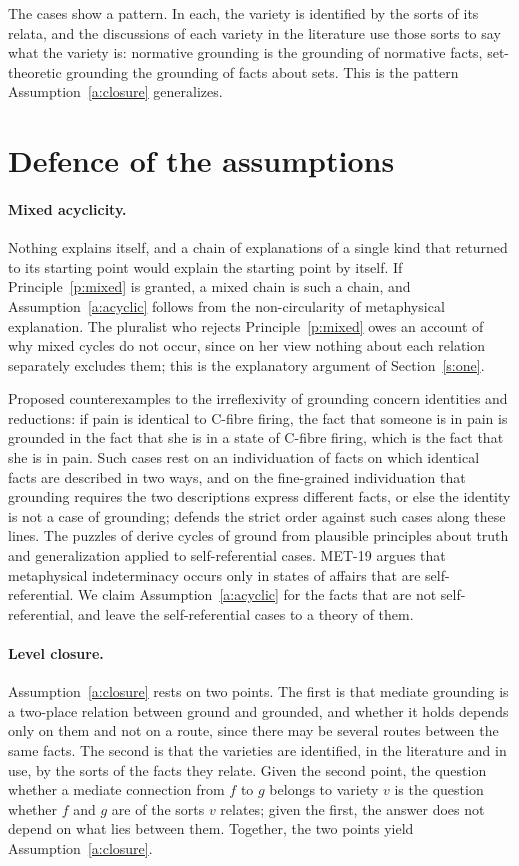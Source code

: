 \documentclass{situationist-preprint}
\begin{document}
The cases show a pattern. In each, the variety is identified by the sorts of its relata, and the discussions of each variety in the literature use those sorts to say what the variety is: normative grounding is the grounding of normative facts, set-theoretic grounding the grounding of facts about sets. This is the pattern Assumption~\ref{a:closure} generalizes.

\section{Defence of the assumptions}\label{s:defence}

\paragraph{Mixed acyclicity.} Nothing explains itself, and a chain of explanations of a single kind that returned to its starting point would explain the starting point by itself. If Principle~\ref{p:mixed} is granted, a mixed chain is such a chain, and Assumption~\ref{a:acyclic} follows from the non-circularity of metaphysical explanation. The pluralist who rejects Principle~\ref{p:mixed} owes an account of why mixed cycles do not occur, since on her view nothing about each relation separately excludes them; this is the explanatory argument of Section~\ref{s:one}.

Proposed counterexamples to the irreflexivity of grounding \citep{Jenkins2011} concern identities and reductions: if pain is identical to C-fibre firing, the fact that someone is in pain is grounded in the fact that she is in a state of C-fibre firing, which is the fact that she is in pain. Such cases rest on an individuation of facts on which identical facts are described in two ways, and on the fine-grained individuation that grounding requires the two descriptions express different facts, or else the identity is not a case of grounding; \citet{Raven2013} defends the strict order against such cases along these lines. The puzzles of \citet{Fine2010} derive cycles of ground from plausible principles about truth and generalization applied to self-referential cases. MET-19 argues that metaphysical indeterminacy occurs only in states of affairs that are self-referential. We claim Assumption~\ref{a:acyclic} for the facts that are not self-referential, and leave the self-referential cases to a theory of them.

\paragraph{Level closure.} Assumption~\ref{a:closure} rests on two points. The first is that mediate grounding is a two-place relation between ground and grounded, and whether it holds depends only on them and not on a route, since there may be several routes between the same facts. The second is that the varieties are identified, in the literature and in use, by the sorts of the facts they relate. Given the second point, the question whether a mediate connection from $f$ to $g$ belongs to variety $v$ is the question whether $f$ and $g$ are of the sorts $v$ relates; given the first, the answer does not depend on what lies between them. Together, the two points yield Assumption~\ref{a:closure}.
\end{document}
